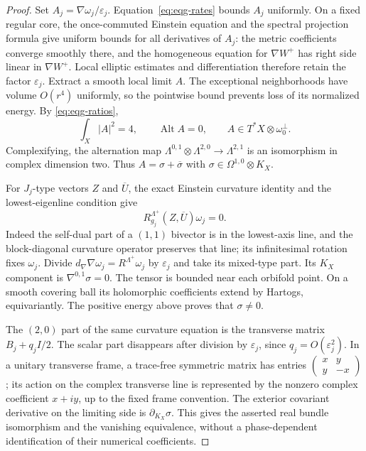 \begin{proof}
Set $A_j=\nabla\omega_j/\varepsilon_j$.
Equation~\eqref{eq:eqg-rates} bounds $A_j$ uniformly.  On a fixed
regular core, the once-commuted Einstein equation and the spectral
projection formula give uniform bounds for all derivatives of $A_j$:
the metric coefficients converge smoothly there, and the homogeneous
equation for $\nabla W^+$ has right side linear in $\nabla W^+$.
Local elliptic estimates and differentiation therefore retain the
factor $\varepsilon_j$.  Extract a smooth local limit $A$.
The exceptional neighborhoods have volume $O(r^4)$ uniformly, so
the pointwise bound prevents loss of its normalized energy.  By
\eqref{eq:eqg-ratios},
\[
 \int_X|A|^2=4,\qquad \operatorname{Alt}A=0,
 \qquad A\in T^*X\otimes\omega_0^\perp.
\]
Complexifying, the alternation map
$\Lambda^{0,1}\otimes\Lambda^{2,0}\to\Lambda^{2,1}$ is an
isomorphism in complex dimension two.  Thus
$A=\sigma+\overline\sigma$ with
$\sigma\in\Omega^{1,0}\otimes K_X$.

For $J_j$-type vectors $Z$ and $\overline U$, the exact Einstein
curvature identity and the lowest-eigenline condition give
\[
 R^{\Lambda^+}_{g_j}(Z,\overline U)\omega_j=0.
\]
Indeed the self-dual part of a $(1,1)$ bivector is in the lowest-axis
line, and the block-diagonal curvature operator preserves that line;
its infinitesimal rotation fixes $\omega_j$.
Divide $d_\nabla\nabla\omega_j=R^{\Lambda^+}\omega_j$ by
$\varepsilon_j$ and take its mixed-type part.  Its $K_X$ component
is $\nabla^{0,1}\sigma=0$.  The tensor is bounded near each
orbifold point.  On a smooth covering ball its holomorphic
coefficients extend by Hartogs, equivariantly.  The positive energy
above proves that $\sigma\ne0$.

The $(2,0)$ part of the same curvature equation is the transverse
matrix $B_j+q_jI/2$.  The scalar part disappears after division by
$\varepsilon_j$, since $q_j=O(\varepsilon_j^2)$.
In a unitary transverse frame, a trace-free symmetric matrix has
entries $\left(\begin{smallmatrix}x&y\\y&-x\end{smallmatrix}\right)$;
its action on the complex transverse line is represented by the
nonzero complex coefficient $x+iy$, up to the fixed frame convention.
The exterior covariant derivative on the limiting side is
$\partial_{K_X}\sigma$.  This gives the asserted real bundle
isomorphism and the vanishing equivalence, without a phase-dependent
identification of their numerical coefficients.
\end{proof}

